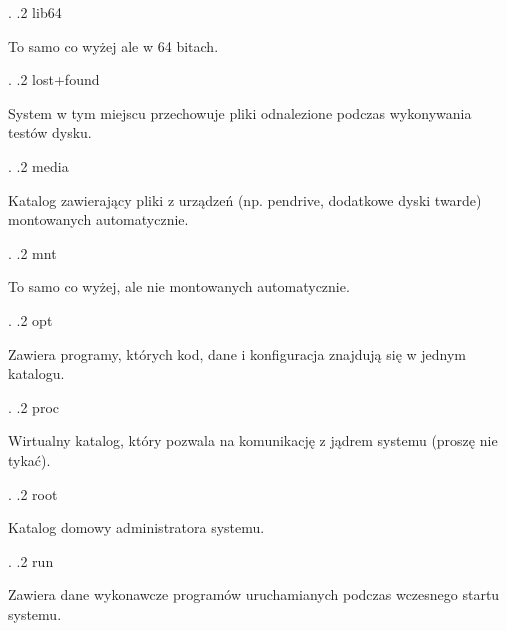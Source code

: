 \documentclass[11pt, a4paper]{article}
\begin{document}
{\begin{minipage}[t]{0.7\textwidth}
            \vspace{\baselineskip}
        \end{minipage}.
        .2 lib64 \dotfill \begin{minipage}[t]{0.7\textwidth}
            \textnormal{To samo co wyżej ale w 64 bitach.}
            \vspace{\baselineskip}
        \end{minipage}.
        .2 lost+found \dotfill \begin{minipage}[t]{0.7\textwidth}
            \textnormal{System w tym miejscu przechowuje pliki odnalezione podczas wykonywania testów dysku. }
            \vspace{\baselineskip}
        \end{minipage}.
        .2 media \dotfill \begin{minipage}[t]{0.7\textwidth}
            \textnormal{Katalog zawierający pliki z urządzeń (np. pendrive, dodatkowe dyski twarde) montowanych automatycznie.}
            \vspace{\baselineskip}
        \end{minipage}.
        .2 mnt \dotfill \begin{minipage}[t]{0.7\textwidth}
            \textnormal{To samo co wyżej, ale nie montowanych automatycznie.}
            \vspace{\baselineskip}
        \end{minipage}.
        .2 opt \dotfill \begin{minipage}[t]{0.7\textwidth}
            \textnormal{Zawiera programy, których kod, dane i konfiguracja znajdują się w jednym katalogu.}
            \vspace{\baselineskip}
        \end{minipage}.
        .2 proc \dotfill \begin{minipage}[t]{0.7\textwidth}
            \textnormal{Wirtualny katalog, który pozwala na komunikację z jądrem  systemu (proszę nie tykać).}
            \vspace{\baselineskip}
        \end{minipage}.
        .2 root \dotfill \begin{minipage}[t]{0.7\textwidth}
            \textnormal{Katalog domowy administratora systemu.}
            \vspace{\baselineskip}
        \end{minipage}.
        .2 run \dotfill \begin{minipage}[t]{0.7\textwidth}
            \textnormal{Zawiera dane wykonawcze programów uruchamianych podczas wczesnego startu systemu.}

\end{minipage}}
\end{document}

